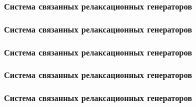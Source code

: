 \documentclass[10pt,utf8]{beamer}
\begin{document}

\begin{frame}
  \frametitle{Система связанных релаксационных генераторов}


\end{frame}




\begin{frame}
  \frametitle{Система связанных релаксационных генераторов}


\end{frame}




\begin{frame}
  \frametitle{Система связанных релаксационных генераторов}


\end{frame}




\begin{frame}
  \frametitle{Система связанных релаксационных генераторов}


\end{frame}




\begin{frame}
  \frametitle{Система связанных релаксационных генераторов}


\end{frame}



\end{document}
